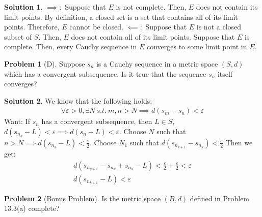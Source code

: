\documentclass[12pt]{article}
\theoremstyle{definition} %
\newtheorem{solution}{Solution}
\newtheorem{problem}{Problem}
\theoremstyle{plain} %
\begin{document}
\begin{solution}
    $\implies :$ Suppose that $E$ is not complete. Then, $E$ does not contain its limit points. By definition, a closed set is a set that contains all of its limit points. Therefore, $E$ cannot be closed.
    $\impliedby :$ Suppose that $E$ is not a closed subset of $S$. Then, $E$ does not contain all of its limit points. Suppose that $E$ is complete. Then, every Cauchy sequence in $E$ converges to some limit point in $E$.
\end{solution}
\begin{problem}[D]
    Suppose $s_{n} $ is a Cauchy sequence in a metric space $(S,d)$ which has a convergent subsequence. Is it true that the sequence $s_{n} $ itself converges?
\end{problem}

\begin{solution}
   We know that the following holds:
   \begin{align}
    \forall \varepsilon >0, \exists N\ s.t. \ m,n>N\implies d(s_{m} -s_{n} )<\varepsilon 
   \end{align} 
   Want: If $s_{n} $ has a convergent subsequence, then $L\in S$, $d(s_{n_{k} }-L )<\varepsilon\implies d(s_{n} -L)<\varepsilon  $.
   Choose $N$ such that $n>N\implies d(s_{n_{k}  } -L)<\frac{\varepsilon}{2}$.
   Choose $N_{1} $ such that $d(s_{n_{k+1} }-s_{n_{k} }  )<\frac{\varepsilon}{2}$  
   Then we get:
   \begin{align}
    d(s_{n_{k+1} }-s_{n_{k} }+s_{n_{k} }-L   )<\frac{\varepsilon}{2}+\frac{\varepsilon}{2}<\varepsilon \\[10pt] 
    d(s_{n_{k+1} }-L )<\varepsilon 
   \end{align}
\end{solution}

\begin{problem}[Bonus Problem]
    Is the metric space $(B,d)$ defined in Problem 13.3(a) complete?
\end{problem}
\end{document}

